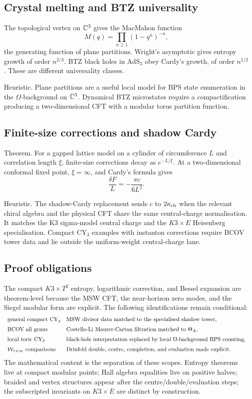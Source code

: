 \subsection*{Crystal melting and BTZ universality}

The topological vertex on \(\mathbb{C}^3\) gives the MacMahon function
\[
M(q)=\prod_{n\geq 1}(1-q^n)^{-n},
\]
the generating function of plane partitions. Wright's asymptotic gives
entropy growth of order \(n^{2/3}\). BTZ black holes in
\(\mathrm{AdS}_3\) obey Cardy's growth, of order \(n^{1/2}\). These are
different universality classes.

Heuristic. Plane partitions are a useful local model for BPS state
enumeration in the \(\Omega\)-background on \(\mathbb{C}^3\). Dynamical BTZ
microstates require a compactification producing a two-dimensional CFT
with a modular torus partition function.

\subsection*{Finite-size corrections and shadow Cardy}

Theorem. For a gapped lattice model on a cylinder of circumference
\(L\) and correlation length \(\xi\), finite-size corrections decay as
\(e^{-L/\xi}\). At a two-dimensional conformal fixed point,
\(\xi=\infty\), and Cardy's formula gives
\[
\frac{\delta F}{L}=-\frac{\pi c}{6L^2}.
\]

Heuristic. The shadow-Cardy replacement sends \(c\) to \(2\kappa_{\mathrm{ch}}\) when
the relevant chiral algebra and the physical CFT share the same
central-charge normalisation. It matches the K3 sigma-model central
charge and the \(K3\times E\) Heisenberg specialisation. Compact
CY\(_3\) examples with instanton corrections require BCOV tower data
and lie outside the uniform-weight central-charge lane.

\subsection*{Proof obligations}

The compact \(K3\times T^2\) entropy, logarithmic correction, and
Bessel expansion are theorem-level because the MSW CFT, the
near-horizon zero modes, and the Siegel modular form are explicit. The
following identifications remain conditional:
\[
\begin{array}{ll}
\text{general compact CY}_3 &
\text{MSW divisor data matched to the specialised shadow tower},\\[2mm]
\text{BCOV all genus} &
\text{Costello-Li Maurer-Cartan filtration matched to }\Theta_A,\\[2mm]
\text{local toric CY}_3 &
\text{black-hole interpretation replaced by local }\Omega\text{-background BPS counting},\\[2mm]
\mathcal{W}_{1+\infty}\text{ comparisons} &
\text{Drinfeld double, centre, completion, and evaluation made explicit}.
\end{array}
\]
The mathematical content is the separation of these scopes. Entropy
theorems live at compact modular points; Hall algebra equalities live
on positive halves; braided and vertex structures appear after
the centre/double/evaluation steps; the subscripted invariants on
\(K3\times E\) are distinct by construction.
